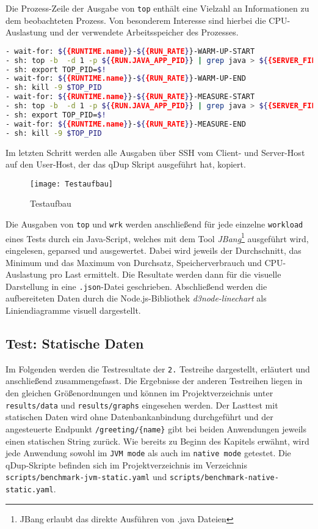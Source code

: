 Die Prozess-Zeile der Ausgabe von \verb|top| enthält eine Vielzahl an Informationen zu dem beobachteten Prozess. Von besonderem
Interesse sind hierbei die CPU-Auslastung und der verwendete Arbeitsspeicher des Prozesses. \parencite{linuxTopManual}

\begin{lstlisting}[language=sh, caption=Auszug des qDup Skripts capture-platform-stats, captionpos=b]
- wait-for: ${{RUNTIME.name}}-${{RUN_RATE}}-WARM-UP-START
- sh: top -b  -d 1 -p ${{RUN.JAVA_APP_PID}} | grep java > ${{SERVER_FILE_PATH}}/output/${{RUNTIME.name}}-${{RUN_RATE}}-WARM-UP-top.out &
- sh: export TOP_PID=$!
- wait-for: ${{RUNTIME.name}}-${{RUN_RATE}}-WARM-UP-END
- sh: kill -9 $TOP_PID
- wait-for: ${{RUNTIME.name}}-${{RUN_RATE}}-MEASURE-START
- sh: top -b  -d 1 -p ${{RUN.JAVA_APP_PID}} | grep java > ${{SERVER_FILE_PATH}}/output/${{RUNTIME.name}}-${{RUN_RATE}}-MEASURE-top.out &
- sh: export TOP_PID=$!
- wait-for: ${{RUNTIME.name}}-${{RUN_RATE}}-MEASURE-END
- sh: kill -9 $TOP_PID
  \end{lstlisting}

Im letzten Schritt werden alle Ausgaben über SSH vom Client- und Server-Host auf den User-Host, der das qDup Skript ausgeführt hat, kopiert.

\begin{figure}[ht]
  \centering
  \texttt{[image: Testaufbau]}
  \caption{Testaufbau}
\end{figure}

Die Ausgaben von \verb|top| und \verb|wrk| werden anschließend für jede einzelne \verb|workload| eines Tests durch ein Java-Script, welches mit
dem Tool \textit{JBang}\footnote{JBang erlaubt das direkte Ausführen von .java Dateien} ausgeführt wird, eingelesen, geparsed und ausgewertet.
Dabei wird jeweils der Durchschnitt, das Minimum und das Maximum von Durchsatz, Speicherverbrauch und CPU-Auslastung pro Last ermittelt.
Die Resultate werden dann für die visuelle Darstellung in eine \verb|.json|-Datei geschrieben.
Abschließend werden die aufbereiteten Daten durch die Node.js-Bibliothek \textit{d3node-linechart} als Liniendiagramme visuell dargestellt.

\subsection{Test: Statische Daten}
\label{subsection:statische_daten}
Im Folgenden werden die Testresultate der \verb|2.| Testreihe dargestellt, erläutert und anschließend zusammengefasst.
Die Ergebnisse der anderen Testreihen liegen in den gleichen Größenordnungen und können im Projektverzeichnis unter \verb|results/data| und \verb|results/graphs| eingesehen werden.
Der Lasttest mit statischen Daten wird ohne Datenbankanbindung durchgeführt und der angesteuerte Endpunkt \verb|/greeting/{name}| gibt bei beiden Anwendungen
jeweils einen statischen String zurück. Wie bereits zu Beginn des Kapitels erwähnt, wird jede Anwendung sowohl im \verb|JVM mode| als auch im
\verb|native mode| getestet.
Die qDup-Skripte befinden sich im Projektverzeichnis im Verzeichnis \verb|scripts/benchmark-jvm-static.yaml| und
\verb|scripts/benchmark-native-static.yaml|.

